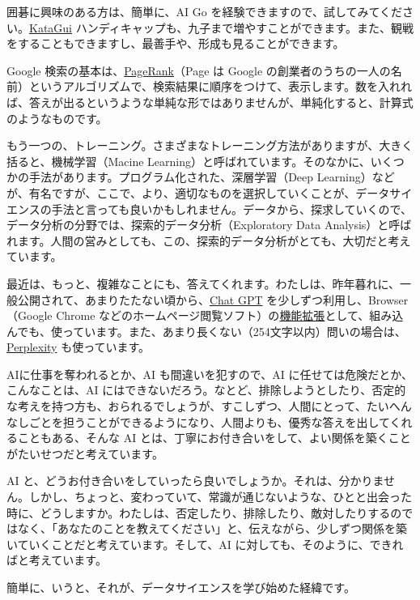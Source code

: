 \documentclass[
]{bxjsbook}
\theoremstyle{definition}
\theoremstyle{definition}
\theoremstyle{definition}
\theoremstyle{definition}
\theoremstyle{remark}
\begin{document}
囲碁に興味のある方は、簡単に、AI Go を経験できますので、試してみてください。\href{https://katagui.baduk.club/}{KataGui} ハンディキャップも、九子まで増やすことができます。また、観戦をすることもできますし、最善手や、形成も見ることができます。

Google 検索の基本は、\href{https://en.wikipedia.org/wiki/PageRank}{PageRank}（Page は Google の創業者のうちの一人の名前）というアルゴリズムで、検索結果に順序をつけて、表示します。数を入れれば、答えが出るというような単純な形ではありませんが、単純化すると、計算式のようなものです。

もう一つの、トレーニング。さまざまなトレーニング方法がありますが、大きく括ると、機械学習（Macine Learning）と呼ばれています。そのなかに、いくつかの手法があります。プログラム化された、深層学習（Deep Learning）などが、有名ですが、ここで、より、適切なものを選択していくことが、データサイエンスの手法と言っても良いかもしれません。データから、探求していくので、データ分析の分野では、探索的データ分析（Exploratory Data Analysis）と呼ばれます。人間の営みとしても、この、探索的データ分析がとても、大切だと考えています。

最近は、もっと、複雑なことにも、答えてくれます。わたしは、昨年暮れに、一般公開されて、あまりたたない頃から、\href{https://openai.com/blog/chatgpt}{Chat GPT} を少しずつ利用し、Browser（Google Chrome などのホームページ閲覧ソフト）の\href{https://chrome.google.com/webstore/detail/chatgpt-for-google/jgjaeacdkonaoafenlfkkkmbaopkbilf}{機能拡張}として、組み込んでも、使っています。また、あまり長くない（254文字以内）問いの場合は、\href{https://www.perplexity.ai}{Perplexity} も使っています。

AIに仕事を奪われるとか、AI も間違いを犯すので、AI に任せては危険だとか、こんなことは、AI にはできないだろう。なとど、排除しようとしたり、否定的な考えを持つ方も、おられるでしょうが、すこしずつ、人間にとって、たいへんなしごとを担うことができるようになり、人間よりも、優秀な答えを出してくれることもある、そんな AI とは、丁寧にお付き合いをして、よい関係を築くことがたいせつだと考えています。

AI と、どうお付き合いをしていったら良いでしょうか。それは、分かりません。しかし、ちょっと、変わっていて、常識が通じないような、ひとと出会った時に、どうしますか。わたしは、否定したり、排除したり、敵対したりするのではなく、「あなたのことを教えてください」と、伝えながら、少しずつ関係を築いていくことだと考えています。そして、AI に対しても、そのように、できればと考えています。

簡単に、いうと、それが、データサイエンスを学び始めた経緯です。
\end{document}
